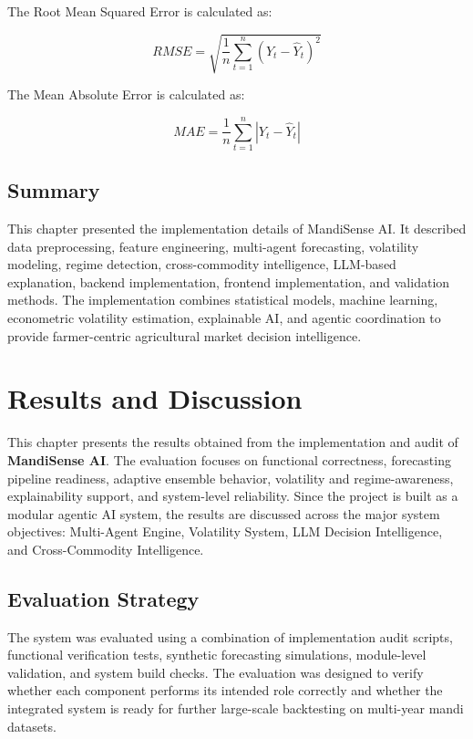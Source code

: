 \documentclass[12pt,a4paper]{report}
\begin{document}
The Root Mean Squared Error is calculated as:

\begin{equation}
RMSE = \sqrt{\frac{1}{n} \sum_{t=1}^{n} (Y_t - \hat{Y}_t)^2}
\end{equation}

The Mean Absolute Error is calculated as:

\begin{equation}
MAE = \frac{1}{n} \sum_{t=1}^{n} |Y_t - \hat{Y}_t|
\end{equation}

\section{Summary}

This chapter presented the implementation details of MandiSense AI. It described data preprocessing, feature engineering, multi-agent forecasting, volatility modeling, regime detection, cross-commodity intelligence, LLM-based explanation, backend implementation, frontend implementation, and validation methods. The implementation combines statistical models, machine learning, econometric volatility estimation, explainable AI, and agentic coordination to provide farmer-centric agricultural market decision intelligence.


\chapter{Results and Discussion}

This chapter presents the results obtained from the implementation and audit of \textbf{MandiSense AI}. The evaluation focuses on functional correctness, forecasting pipeline readiness, adaptive ensemble behavior, volatility and regime-awareness, explainability support, and system-level reliability. Since the project is built as a modular agentic AI system, the results are discussed across the major system objectives: Multi-Agent Engine, Volatility System, LLM Decision Intelligence, and Cross-Commodity Intelligence.

\section{Evaluation Strategy}

The system was evaluated using a combination of implementation audit scripts, functional verification tests, synthetic forecasting simulations, module-level validation, and system build checks. The evaluation was designed to verify whether each component performs its intended role correctly and whether the integrated system is ready for further large-scale backtesting on multi-year mandi datasets.
\end{document}
